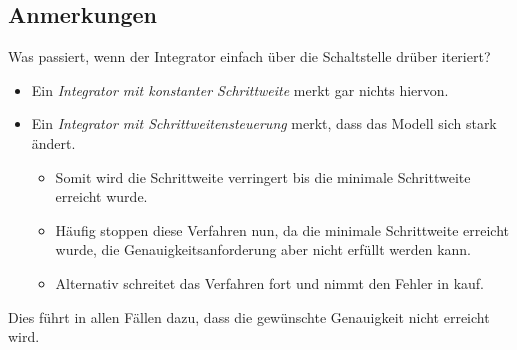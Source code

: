 \documentclass[a4paper, 11pt, accentcolor = tud3b]{tudreport}
\begin{document}
            \subsection{Anmerkungen} %
	            Was passiert, wenn der Integrator einfach über die Schaltstelle drüber iteriert?
                \begin{itemize}
                	\item Ein \textit{Integrator mit konstanter Schrittweite} merkt gar nichts hiervon.
                	\item Ein \textit{Integrator mit Schrittweitensteuerung} merkt, dass das Modell sich stark ändert.
	                	\begin{itemize}
	                		\item Somit wird die Schrittweite verringert bis die minimale Schrittweite erreicht wurde.
	                		\item Häufig stoppen diese Verfahren nun, da die minimale Schrittweite erreicht wurde, die Genauigkeitsanforderung aber nicht erfüllt werden kann.
	                		\item Alternativ schreitet das Verfahren fort und nimmt den Fehler in kauf.
	                	\end{itemize}
                \end{itemize}
                Dies führt in allen Fällen dazu, dass die gewünschte Genauigkeit nicht erreicht wird.
\end{document}

